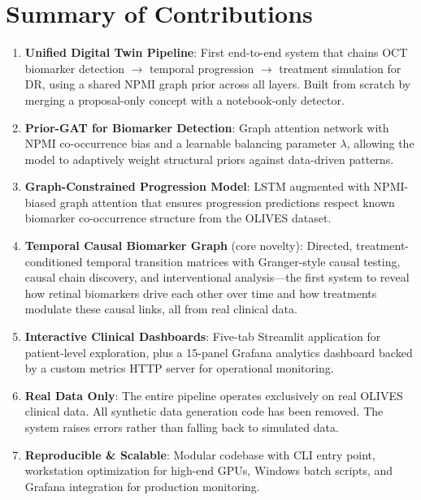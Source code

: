 \documentclass[12pt,a4paper]{article}
\begin{document}
\section{Summary of Contributions}

\begin{enumerate}[leftmargin=*]
  \item \textbf{Unified Digital Twin Pipeline}: First end-to-end system that chains OCT biomarker detection $\to$ temporal progression $\to$ treatment simulation for DR, using a shared NPMI graph prior across all layers. Built from scratch by merging a proposal-only concept with a notebook-only detector.

  \item \textbf{Prior-GAT for Biomarker Detection}: Graph attention network with NPMI co-occurrence bias and a learnable balancing parameter $\lambda$, allowing the model to adaptively weight structural priors against data-driven patterns.

  \item \textbf{Graph-Constrained Progression Model}: LSTM augmented with NPMI-biased graph attention that ensures progression predictions respect known biomarker co-occurrence structure from the OLIVES dataset.

  \item \textbf{Temporal Causal Biomarker Graph} (core novelty): Directed, treatment-conditioned temporal transition matrices with Granger-style causal testing, causal chain discovery, and interventional analysis---the first system to reveal how retinal biomarkers drive each other over time and how treatments modulate these causal links, all from real clinical data.

  \item \textbf{Interactive Clinical Dashboards}: Five-tab Streamlit application for patient-level exploration, plus a 15-panel Grafana analytics dashboard backed by a custom metrics HTTP server for operational monitoring.

  \item \textbf{Real Data Only}: The entire pipeline operates exclusively on real OLIVES clinical data. All synthetic data generation code has been removed. The system raises errors rather than falling back to simulated data.

  \item \textbf{Reproducible \& Scalable}: Modular codebase with CLI entry point, workstation optimization for high-end GPUs, Windows batch scripts, and Grafana integration for production monitoring.
\end{enumerate}
\end{document}
